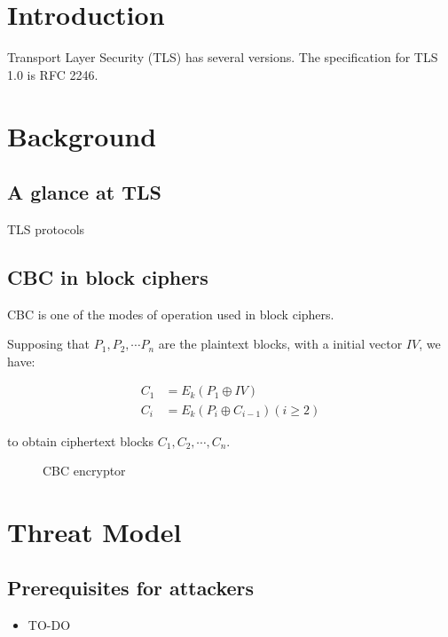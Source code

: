 \documentclass{acm_proc_article-sp}
\begin{document}

\section{Introduction}
Transport Layer Security (TLS) has several versions. The specification for TLS
1.0 is RFC 2246\cite{rfc2246}.

\section{Background}
\subsection{A glance at TLS}

TLS protocols

\subsection{CBC in block ciphers}
CBC is one of the modes of operation used in block ciphers.

Supposing that $P_1,P_2,\cdots P_n$ are the plaintext blocks, with a initial vector $IV$, we have:

$$
\begin{aligned}
C_1&=E_k(P_1\oplus IV)\\
C_i&=E_k(P_{i}\oplus C_{i-1}) (i\geq 2)
\end{aligned}
$$

to obtain ciphertext blocks $C_1,C_2,\cdots,C_n$.

\begin{figure}[htb]
  \centering
  
  \caption{CBC encryptor}
\end{figure}
\section{Threat Model}
\subsection{Prerequisites for attackers}
\begin{itemize}
    \item TO-DO
\end{itemize}
\end{document}
